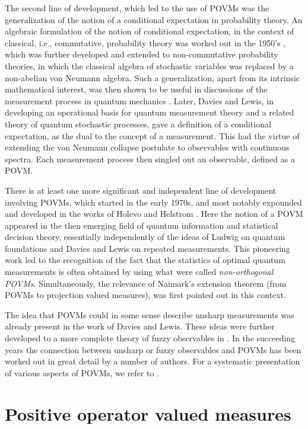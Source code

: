 \documentclass[12pt]{amsart}
\theoremstyle{definition}
\begin{document}
The second line of development, which led to the use of POVMs was the generalization
of the notion of a conditional expectation in probability theory. An algebraic formulation of the
notion of conditional expectation, in the context of classical, i.e., commutative, probability
theory was worked out in the 1950's \cite{Moy54, NaTu54}, which was further developed
and extended to non-commutative probability theories, in which the classical
algebra of stochastic variables was replaced by a non-abelian von
Neumann algebra. Such a generalization, apart from its intrinsic mathematical
interest,  was then shown to be  useful in discussions of the measurement process in
quantum mechanics \cite{NaUm62,Umegaki54}.  Later,  Davies and Lewis, in
developing an operational basis for quantum measurement theory and a related
theory of quantum stochastic processes,  \cite{DaLe70,Davies70, QTOS76} gave
a definition of a conditional expectation, as the dual to the concept of a measurement.
This had the virtue of extending the von Neumann collapse postulate to observables
with continuous spectra. Each measurement process then singled out an observable,
defined as a POVM.

There is at least one more significant and independent 
line of development involving
POVMs,  which  started in the early 1970s, and most notably expounded and 
developed in the works of 
Holevo and Helstrom  \cite{He76,Ho82}.  Here the notion of a POVM appeared in the
then emerging field of quantum information and statistical decision theory,
essentially independently of the ideas of Ludwig on quantum foundations and
Davies and Lewis on repeated measurements. This pioneering work led to the
recognition of the fact that the statistics of  optimal quantum
measurements is often obtained by using what were called {\em non-orthogonal POVMs}.
Simultaneously, the  relevance of  Naimark's extension theorem (from POVMs to projection 
valued measures),  was first pointed out in this context.


The idea that POVMs could in some sense describe unsharp measurements was already
present in the work of Davies and Lewis. These ideas were further developed to a
more complete theory of fuzzy observables in \cite{AlEm74, SQMQS84}. In the
succeeding years the connection between unsharp or fuzzy observables and POVMs
has been worked out in great detail by a number of authors. For a systematic
presentation of various aspects of POVMs, we refer to \cite{OQP97}.

\section{Positive operator valued measures}\label{sec:povm}
\end{document}
